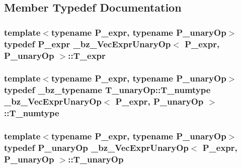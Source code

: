 \subsection{Member Typedef Documentation}
\hypertarget{class__bz__VecExprUnaryOp_a548e39ca3d7cd9ac4613ca52d665aeb2}{}
\subsubsection[{T\+\_\+expr}]{\setlength{\rightskip}{0pt plus 5cm}template$<$typename P\+\_\+expr, typename P\+\_\+unary\+Op$>$ typedef P\+\_\+expr {\bf \+\_\+bz\+\_\+\+Vec\+Expr\+Unary\+Op}$<$ P\+\_\+expr, P\+\_\+unary\+Op $>$\+::{\bf T\+\_\+expr}}\label{class__bz__VecExprUnaryOp_a548e39ca3d7cd9ac4613ca52d665aeb2}
\hypertarget{class__bz__VecExprUnaryOp_acb8a38cc50c0d7ceb35a1f81e5ff9e8c}{}
\subsubsection[{T\+\_\+numtype}]{\setlength{\rightskip}{0pt plus 5cm}template$<$typename P\+\_\+expr, typename P\+\_\+unary\+Op$>$ typedef {\bf \+\_\+bz\+\_\+typename} T\+\_\+unary\+Op\+::\+T\+\_\+numtype {\bf \+\_\+bz\+\_\+\+Vec\+Expr\+Unary\+Op}$<$ P\+\_\+expr, P\+\_\+unary\+Op $>$\+::{\bf T\+\_\+numtype}}\label{class__bz__VecExprUnaryOp_acb8a38cc50c0d7ceb35a1f81e5ff9e8c}
\hypertarget{class__bz__VecExprUnaryOp_a2cd4ec9646af49a1cf41d940a7570130}{}
\subsubsection[{T\+\_\+unary\+Op}]{\setlength{\rightskip}{0pt plus 5cm}template$<$typename P\+\_\+expr, typename P\+\_\+unary\+Op$>$ typedef P\+\_\+unary\+Op {\bf \+\_\+bz\+\_\+\+Vec\+Expr\+Unary\+Op}$<$ P\+\_\+expr, P\+\_\+unary\+Op $>$\+::{\bf T\+\_\+unary\+Op}}\label{class__bz__VecExprUnaryOp_a2cd4ec9646af49a1cf41d940a7570130}



